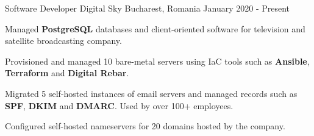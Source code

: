 \begin{cventries}
  \cventry
    {Software Developer}
    {Digital Sky}
    {Bucharest, Romania}
    {January 2020 - Present}
    {
      \begin{cvitems}
        \item {Managed \textbf{PostgreSQL} databases and client-oriented software for television and satellite broadcasting company.}
        \item {Provisioned and managed 10 bare-metal servers using IaC tools such as \textbf{Ansible}, \textbf{Terraform} and \textbf{Digital Rebar}.}
        \item {Migrated 5 self-hosted instances of email servers and managed records such as \textbf{SPF}, \textbf{DKIM} and \textbf{DMARC}. Used by over 100+ employees.}
        \item {Configured self-hosted nameservers for 20 domains hosted by the company.}
      \end{cvitems}
    }
\end{cventries}
